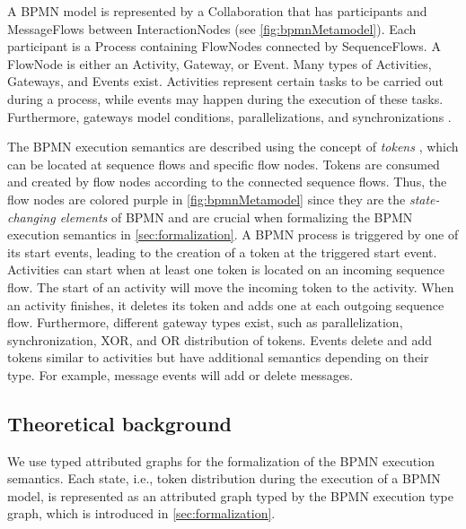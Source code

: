 \documentclass[runningheads]{llncs}
\begin{document}
A BPMN model is represented by a \textsf{Collaboration} that has \textsf{participants} and \textsf{MessageFlows} between \textsf{InteractionNodes} (see  \autoref{fig:bpmnMetamodel}).
Each participant is a \textsf{Process} containing \textsf{FlowNodes} connected by \textsf{SequenceFlows}.
A \textsf{FlowNode} is either an \textsf{Activity}, \textsf{Gateway}, or \textsf{Event}.
Many types of \textsf{Activities}, \textsf{Gateways}, and \textsf{Events} exist.
Activities represent certain tasks to be carried out during a process, while events may happen during the execution of these tasks.
Furthermore, gateways model conditions, parallelizations, and synchronizations \cite{freundRealLifeBPMNUsing2019}.

The BPMN execution semantics are described using the concept of \emph{tokens} \cite{objectmanagementgroupBusinessProcessModel2013}, which can be located at sequence flows and specific flow nodes.
Tokens are consumed and created by flow nodes according to the connected sequence flows.
Thus, the flow nodes are colored purple in \autoref{fig:bpmnMetamodel} since they are the \textit{state-changing elements} of BPMN and are crucial when formalizing the BPMN execution semantics in \autoref{sec:formalization}.
A BPMN process is triggered by one of its start events, leading to the creation of a token at the triggered start event.
Activities can start when at least one token is located on an incoming sequence flow.
The start of an activity will move the incoming token to the activity.
When an activity finishes, it deletes its token and adds one at each outgoing sequence flow.
Furthermore, different gateway types exist, such as parallelization, synchronization, XOR, and OR distribution of tokens.
Events delete and add tokens similar to activities but have additional semantics depending on their type.
For example, message events will add or delete messages.

\subsection{Theoretical background}
We use typed attributed graphs for the formalization of the BPMN execution semantics.
Each state, i.e., token distribution during the execution of a BPMN model, is represented as an attributed graph typed by the BPMN execution type graph, which is introduced in \autoref{sec:formalization}.
\end{document}
